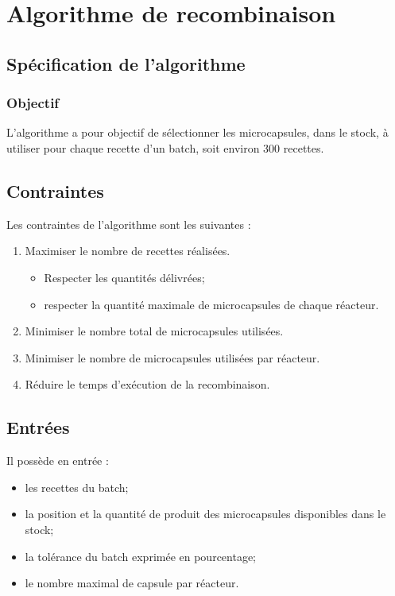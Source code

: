 \section{Algorithme de recombinaison}
\subsection{Spécification de l'algorithme}
\subsubsection*{Objectif}
L'algorithme a pour objectif de sélectionner les microcapsules, dans le stock, à utiliser pour chaque recette d'un batch, soit environ $300$ recettes.

\subsection*{Contraintes}
Les contraintes de l'algorithme sont les suivantes : 
\begin{enumerate}
    \item Maximiser le nombre de recettes réalisées.
    \begin{itemize}
        \item Respecter les quantités délivrées;
        \item respecter la quantité maximale de microcapsules de chaque réacteur.
    \end{itemize}    
    \item Minimiser le nombre total de microcapsules utilisées.
    \item Minimiser le nombre de microcapsules utilisées par réacteur.
    \item Réduire le temps d'exécution de la recombinaison.
\end{enumerate}
\subsection*{Entrées}
Il possède en entrée : 
\begin{itemize}
    \item les recettes du batch;
    \item la position et la quantité de produit des microcapsules disponibles dans le stock;
    \item la tolérance du batch exprimée en pourcentage;
    \item le nombre maximal de capsule par réacteur.
\end{itemize}

